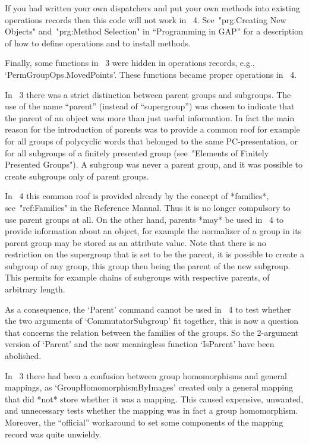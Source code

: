 If you had written your own dispatchers and put your own methods into
existing operations records then this code will not work in {\GAP}~4.
See~"prg:Creating New Objects" and~"prg:Method Selection" in
``Programming in GAP'' for a description of how to define operations
and to install methods.

Finally, some functions in {\GAP}~3 were hidden in
operations records, e.g., `PermGroupOps.MovedPoints'.
These functions became proper operations in {\GAP}~4.



In {\GAP}~3 there was a strict distinction between parent groups and
subgroups.
The use of the name ``parent'' (instead of ``supergroup'')
was chosen to indicate that the parent of an object was more than just
useful information.
In fact the main reason for the introduction of parents was to provide
a common roof for example for all groups of polycyclic words that
belonged to the same PC-presentation, or for all subgroups of a finitely
presented group (see~"Elements of Finitely Presented Groups").
A subgroup was never a parent group, and it was possible to create
subgroups only of parent groups.

In {\GAP}~4 this common roof is provided already by the concept of
*families*, see~"ref:Families" in the Reference Manual.
Thus it is no longer compulsory to use parent groups at all.
On the other hand, parents *may* be used in {\GAP}~4 to provide
information about an object, for example the normalizer of a group in its
parent group may be stored as an attribute value.
Note that there is no restriction on the supergroup that is set to be
the parent,
it is possible to create a subgroup of
any group, this group then being the parent of the new subgroup.
This permits for example chains of subgroups with respective parents,
of arbitrary length.

As a consequence, the `Parent' command cannot be used in {\GAP}~4 to
test whether the two arguments of `CommutatorSubgroup' fit together,
this is now a question that concerns the relation between the families
of the groups.  So the 2-argument version of `Parent' and the now
meaningless function `IsParent' have been abolished.



In {\GAP}~3 there had been a confusion between group homomorphisms and
general mappings, as `GroupHomomorphismByImages' created only a
general mapping that did *not* store whether it was a mapping.  This
caused expensive, unwanted, and unnecessary tests whether the mapping
was in fact a group homomorphism.  Moreover, the ``official''
workaround to set some components of the mapping record was quite
unwieldy.

